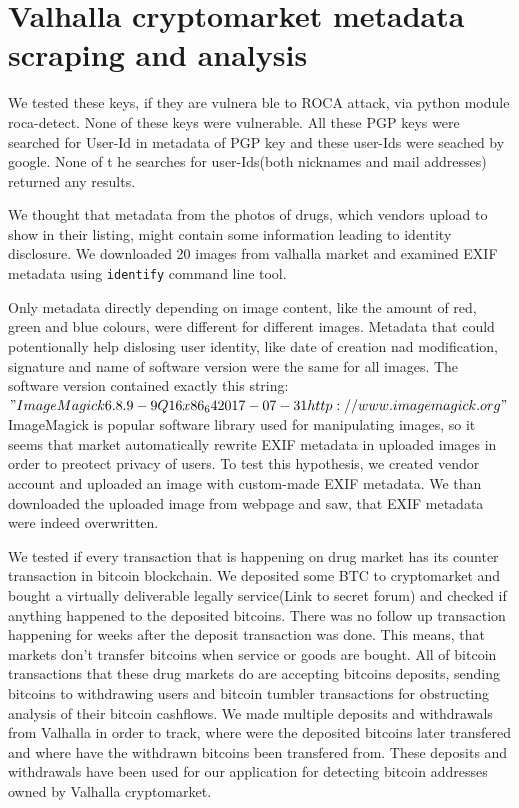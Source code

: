 \documentclass[
  digital, %
  table,   %
  lof,     %
  lot,     %
  oneside
]{fithesis3}
\begin{document}
\section{Valhalla cryptomarket metadata scraping and analysis}

We tested these keys, if they are vulnera ble to ROCA attack, via python module roca-detect. None of these keys were vulnerable.
All these PGP keys were searched for User-Id in metadata of PGP key and these user-Ids were seached by google. None of t
he searches for user-Ids(both nicknames and mail addresses) returned any results.

We thought that metadata from the photos of drugs, which vendors upload
to show in their listing, might contain some information leading to identity disclosure.
We downloaded 20 images from valhalla market and examined 
EXIF metadata using \texttt{identify} command line tool.

Only metadata directly depending on image content, like the amount of red, green and blue colours,
were different for different images.
Metadata that could potentionally help dislosing user identity,
like date of creation nad modification, signature and name of software version were the same for all images.
The software version contained exactly this string:
$"ImageMagick 6.8.9-9 Q16 x86_64 2017-07-31 http://www.imagemagick.org"$
ImageMagick is popular software library used for manipulating images, so it seems
that market automatically rewrite EXIF metadata in uploaded images in order to preotect privacy of users.
To test this hypothesis, we created vendor account and uploaded an image with
custom-made EXIF metadata. We than downloaded the uploaded image from webpage and 
saw, that EXIF metadata were indeed overwritten.

We tested if every transaction that is happening on drug market has its counter transaction
in bitcoin blockchain.
We deposited some BTC to cryptomarket and bought a virtually deliverable
legally service(Link to secret forum) and checked if anything happened to the deposited bitcoins.
There was no follow up transaction happening for weeks after the deposit transaction was done.
This means, that markets don't transfer bitcoins when service or goods are bought.
All of bitcoin transactions that these drug markets do 
are accepting bitcoins deposits,
sending bitcoins to withdrawing users and bitcoin tumbler transactions for
obstructing analysis of their bitcoin cashflows.
We made multiple deposits and withdrawals from Valhalla in order to track,
where were the deposited bitcoins later transfered and where have the withdrawn
bitcoins been transfered from. These deposits and withdrawals have been
used for our application for detecting bitcoin addresses owned by Valhalla cryptomarket.
\end{document}
